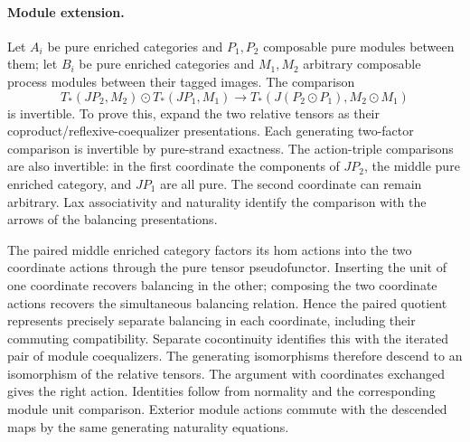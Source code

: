 \documentclass{article}
\begin{document}
\paragraph{Module extension.} Let $A_i$ be pure enriched categories and $P_1,P_2$ composable pure modules between them; let $B_i$ be pure enriched categories and $M_1,M_2$ arbitrary composable process modules between their tagged images. The comparison
\[
 T_*(JP_2,M_2)\odot T_*(JP_1,M_1)
 \longrightarrow T_*(J(P_2\odot P_1),M_2\odot M_1)
\]
is invertible. To prove this, expand the two relative tensors as their coproduct/reflexive-coequalizer presentations. Each generating two-factor comparison is invertible by pure-strand exactness. The action-triple comparisons are also invertible: in the first coordinate the components of $JP_2$, the middle pure enriched category, and $JP_1$ are all pure. The second coordinate can remain arbitrary. Lax associativity and naturality identify the comparison with the arrows of the balancing presentations.

The paired middle enriched category factors its hom actions into the two coordinate actions through the pure tensor pseudofunctor. Inserting the unit of one coordinate recovers balancing in the other; composing the two coordinate actions recovers the simultaneous balancing relation. Hence the paired quotient represents precisely separate balancing in each coordinate, including their commuting compatibility. Separate cocontinuity identifies this with the iterated pair of module coequalizers. The generating isomorphisms therefore descend to an isomorphism of the relative tensors. The argument with coordinates exchanged gives the right action. Identities follow from normality and the corresponding module unit comparison. Exterior module actions commute with the descended maps by the same generating naturality equations.
\end{document}
